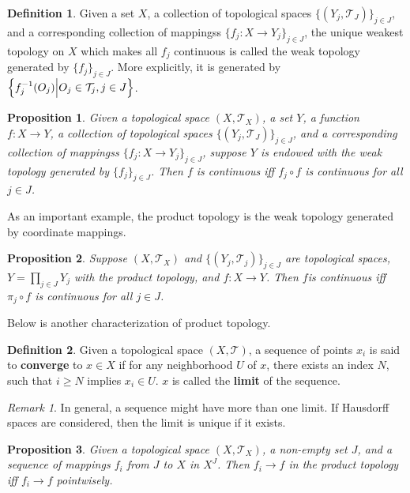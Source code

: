 \documentclass[openany]{book}
\newtheorem{proposition}{Proposition}[chapter]
\theoremstyle{definition}
\newtheorem{definition}{Definition}[chapter]
\theoremstyle{remark}
\newtheorem*{remark}{Remark}
\begin{document}
\begin{definition}
    Given a set $X$, a collection of topological spaces $\{(Y_j,\mathcal{T}_J)\}_{j\in J}$, and a corresponding collection of mappingss $\{f_j:X\to Y_j\}_{j\in J}$, the unique weakest topology on $X$ which makes all $f_j$ continuous is called the weak topology generated by $\{f_j\}_{j\in J}$. More explicitly, it is generated by $\cbr{f_j^{-1}(O_j)\middle|O_j\in \mathcal{T}_j,j\in J}$.
\end{definition}
\begin{proposition}
    Given a topological space $(X,\mathcal{T}_X)$, a set $Y$, a function $f:X\to Y$, a collection of topological spaces $\{(Y_j,\mathcal{T}_J)\}_{j\in J}$, and a corresponding collection of mappingss $\{f_j:X\to Y_j\}_{j\in J}$, suppose $Y$ is endowed with the weak topology generated by $\{f_j\}_{j\in J}$. Then $f$ is continuous iff $f_j\circ f$ is continuous for all $j\in J$.
\end{proposition}
As an important example, the product topology is the weak topology generated by coordinate mappings.
\begin{proposition}
    Suppose $(X,\mathcal{T}_X)$ and $\{(Y_j,\mathcal{T}_j)\}_{j\in J}$ are topological spaces, $Y=\prod_{j\in J}Y_j$ with the product topology, and $f:X\to Y$. Then $f$is continuous iff $\pi_j\circ f$ is continuous for all $j\in J$.
\end{proposition}
Below is another characterization of product topology.
\begin{definition}
    Given a topological space $(X,\mathcal{T})$, a sequence of points $x_i$ is said to \textbf{converge} to $x\in X$ if for any neighborhood $U$ of $x$, there exists an index $N$, such that $i\ge N$ implies $x_i\in U$. $x$ is called the \textbf{limit} of the sequence.
\end{definition}
\begin{remark}
    In general, a sequence might have more than one limit. If Hausdorff spaces are considered, then the limit is unique if it exists.
\end{remark}
\begin{proposition}
    Given a topological space $(X,\mathcal{T}_X)$, a non-empty set $J$, and a sequence of mappings $f_i$ from $J$ to $X$ in $X^J$. Then $f_i\to f$ in the product topology iff $f_i\to f$ pointwisely.
\end{proposition}
\end{document}
